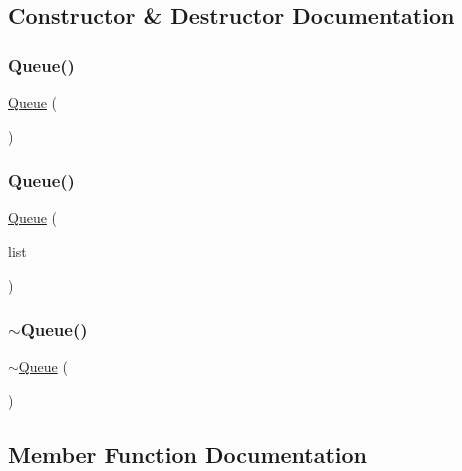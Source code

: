 \subsection{Constructor \& Destructor Documentation}
\mbox{\label{classQueue_a9419268280646dc4ab7b01d6fa3741c8}} 
\subsubsection{\texorpdfstring{Queue()}{Queue()}\hspace{0.1cm}{\footnotesize\ttfamily [1/2]}}
{\footnotesize\ttfamily \mbox{\hyperlink{classQueue}{Queue}} (\begin{DoxyParamCaption}{ }\end{DoxyParamCaption})}

\mbox{\label{classQueue_a0ad6572f7c8e567d440ef6735d2f4a32}} 
\subsubsection{\texorpdfstring{Queue()}{Queue()}\hspace{0.1cm}{\footnotesize\ttfamily [2/2]}}
{\footnotesize\ttfamily \mbox{\hyperlink{classQueue}{Queue}} (\begin{DoxyParamCaption}\item[{std\+::initializer\+\_\+list$<$ Value\+Type $>$}]{list }\end{DoxyParamCaption})}

\mbox{\label{classQueue_a240bdcfcc136e53aeaac3aa454cc26bf}} 
\subsubsection{\texorpdfstring{$\sim$\+Queue()}{~Queue()}}
{\footnotesize\ttfamily $\sim$\mbox{\hyperlink{classQueue}{Queue}} (\begin{DoxyParamCaption}{ }\end{DoxyParamCaption})\hspace{0.3cm}{\ttfamily [virtual]}}



\subsection{Member Function Documentation}
\mbox{\label{classQueue_ab901606bf3a8019c986f0cf9a9f298dc}} 
